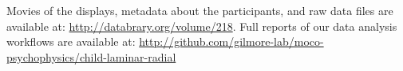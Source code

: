 \documentclass[landscape,final,paperwidth=48in,paperheight=33in,fontscale=0.285]{baposter}
\begin{document}
\begin{poster}
{       Movies of the displays, metadata about the participants, and raw data files are available at: \url{http://databrary.org/volume/218}. Full reports of our data analysis workflows are available at: \url{http://github.com/gilmore-lab/moco-psychophysics/child-laminar-radial}
       
       }

  {
  
  \tiny
  
          \renewcommand{\refname}{\vspace{-0.5em}} %
          
          
          
}
\end{poster}
\end{document}
